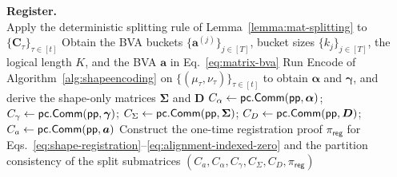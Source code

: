 \begin{algorithm}[!t]
\caption{MLE Claim Conversion Argument}
\label{alg:mleclaimconversion}
\small


\BlankLine
\textbf{Register.}\\
Apply the deterministic splitting rule of
Lemma~\ref{lemma:mat-splitting} to $\{\bm C_\tau\}_{\tau\in[t]}$\;
Obtain the BVA buckets
$\{\bm a^{(j)}\}_{j\in[T]}$, bucket sizes $\{k_j\}_{j\in[T]}$,
the logical length $K$, and the BVA $\bm a$ in
Eq.~\eqref{eq:matrix-bva}\;
Run \textsf{Encode} of Algorithm~\ref{alg:shapeencoding} on
$\{(\mu_\tau,\nu_\tau)\}_{\tau\in[t]}$ to obtain
$\bm\alpha$ and $\bm\gamma$, and derive the shape-only matrices
$\bm\Sigma$ and $\bm D$\;
$C_\alpha\leftarrow{\sf pc}.{\sf Comm}({\sf pp},\bm\alpha)$; \quad
$C_\gamma\leftarrow{\sf pc}.{\sf Comm}({\sf pp},\bm\gamma)$; \quad
$C_\Sigma\leftarrow{\sf pc}.{\sf Comm}({\sf pp},\bm\Sigma)$; \quad
$C_D\leftarrow{\sf pc}.{\sf Comm}({\sf pp},\bm D)$; \quad
$C_a\leftarrow{\sf pc}.{\sf Comm}({\sf pp},\bm a)$\;
Construct the one-time registration proof $\pi_{\mathsf{reg}}$ for
Eqs.~\eqref{eq:shape-registration}--\eqref{eq:alignment-indexed-zero} and
the partition consistency of the split submatrices\;
\Return $(C_a,C_\alpha,C_\gamma,C_\Sigma,C_D,\pi_{\mathsf{reg}})$\;



\end{algorithm}
